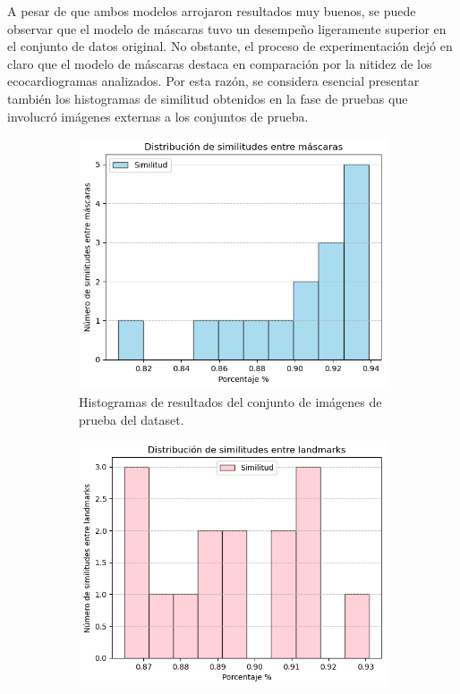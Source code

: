 \documentclass[runningheads]{llncs}
\begin{document}
A pesar de que ambos modelos arrojaron resultados muy buenos, se puede observar que el modelo de máscaras tuvo un desempeño ligeramente superior en el conjunto de datos original. No obstante, el proceso de experimentación dejó en claro que el modelo de máscaras destaca en comparación por la nitidez de los ecocardiogramas analizados. Por esta razón, se considera esencial presentar también los histogramas de similitud obtenidos en la fase de pruebas que involucró imágenes externas a los conjuntos de prueba.

\begin{figure}
    \centering
    \begin{subfigure}{0.45\linewidth}
        \centering
        \includegraphics[scale= 0.3]{images/histograma_exp_mascaras.png}
        \caption{Histogramas de resultados del conjunto de imágenes de prueba del dataset.}
    \end{subfigure}
    \begin{subfigure}{0.45\linewidth}
        \centering
        \includegraphics[scale= 0.3]{images/histograma_exp_landmarks.png}

\end{subfigure}
\end{figure}
\end{document}

